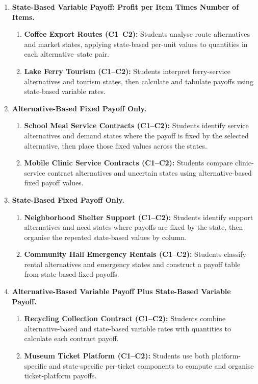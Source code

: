 \begin{enumerate}
		\item \textbf{State-Based Variable Payoff: Profit per Item Times Number of Items.}
		\begin{enumerate}
			\item \textbf{Coffee Export Routes (C1--C2):} Students analyse route alternatives and market states, applying state-based per-unit values to quantities in each alternative--state pair.
			\item \textbf{Lake Ferry Tourism (C1--C2):} Students interpret ferry-service alternatives and tourism states, then calculate and tabulate payoffs using state-based variable rates.
		\end{enumerate}

		\item \textbf{Alternative-Based Fixed Payoff Only.}
		\begin{enumerate}
			\item \textbf{School Meal Service Contracts (C1--C2):} Students identify service alternatives and demand states where the payoff is fixed by the selected alternative, then place those fixed values across the states.
			\item \textbf{Mobile Clinic Service Contracts (C1--C2):} Students compare clinic-service contract alternatives and uncertain states using alternative-based fixed payoff values.
		\end{enumerate}

		\item \textbf{State-Based Fixed Payoff Only.}
		\begin{enumerate}
			\item \textbf{Neighborhood Shelter Support (C1--C2):} Students identify support alternatives and need states where payoffs are fixed by the state, then organise the repeated state-based values by column.
			\item \textbf{Community Hall Emergency Rentals (C1--C2):} Students classify rental alternatives and emergency states and construct a payoff table from state-based fixed payoffs.
		\end{enumerate}

		\item \textbf{Alternative-Based Variable Payoff Plus State-Based Variable Payoff.}
		\begin{enumerate}
			\item \textbf{Recycling Collection Contract (C1--C2):} Students combine alternative-based and state-based variable rates with quantities to calculate each contract payoff.
			\item \textbf{Museum Ticket Platform (C1--C2):} Students use both platform-specific and state-specific per-ticket components to compute and organise ticket-platform payoffs.
		\end{enumerate}


\end{enumerate}
